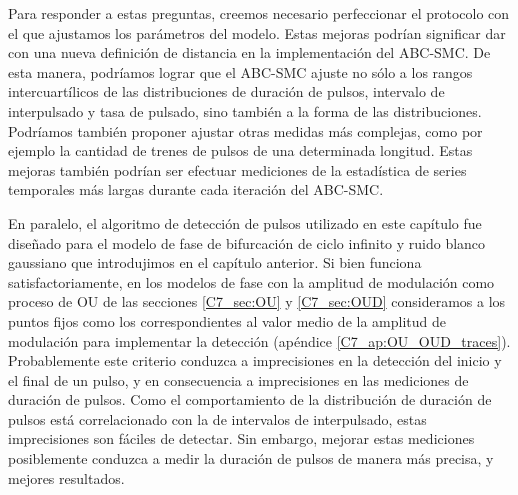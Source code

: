 \documentclass[./main.tex]{subfiles}
\begin{document}
Para responder a estas preguntas, creemos necesario perfeccionar el protocolo con el que ajustamos los parámetros del modelo. Estas mejoras podrían significar dar con una nueva definición de distancia en la implementación del ABC-SMC. De esta manera, podríamos lograr que el ABC-SMC ajuste no sólo a los rangos intercuartílicos de las distribuciones de duración de pulsos, intervalo de interpulsado y tasa de pulsado, sino también a la forma de las distribuciones. Podríamos también proponer ajustar otras medidas más complejas, como por ejemplo la cantidad de trenes de pulsos de una determinada longitud. Estas mejoras también podrían ser efectuar mediciones de la estadística de series temporales más largas durante cada iteración del ABC-SMC. 

En paralelo, el algoritmo de detección de pulsos utilizado en este capítulo fue diseñado para el modelo de fase de bifurcación de ciclo infinito y ruido blanco gaussiano que introdujimos en el capítulo anterior. Si bien funciona satisfactoriamente, en los modelos de fase con la amplitud de modulación como proceso de OU de las secciones \ref{C7_sec:OU} y \ref{C7_sec:OUD} consideramos a los puntos fijos como los correspondientes al valor medio de la amplitud de modulación para implementar la detección (apéndice \ref{C7_ap:OU_OUD_traces}). Probablemente este criterio conduzca a imprecisiones en la detección del inicio y el final de un pulso, y en consecuencia a imprecisiones en las mediciones de duración de pulsos. Como el comportamiento de la distribución de duración de pulsos está correlacionado con la de intervalos de interpulsado, estas imprecisiones son fáciles de detectar. Sin embargo, mejorar estas mediciones posiblemente conduzca a medir la duración de pulsos de manera más precisa, y mejores resultados. 

\end{document}
